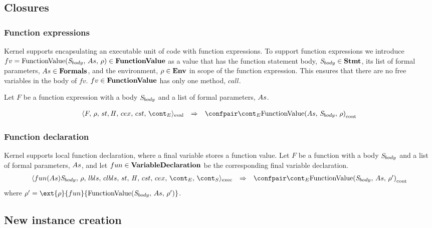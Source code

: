 \documentclass{article}
\begin{document}
\subsection{Closures}
\subsubsection{Function expressions}

Kernel supports encapsulating an executable unit of code with function expressions. To support function expressions we introduce $fv = \mathrm{FunctionValue}({\mathit{S}_{body}},\,{As},\,{\rho}) \in \mathbf{FunctionValue}$ as a value that has the function statement body, $\mathit{S}_{body} \in \mathbf{Stmt}$, its list of formal parameters, $As \in \mathbf{Formals}$, and the environment, $\rho \in \mathbf{Env}$ in scope of the function expression. This ensures that there are no free variables in the body of $fv$. $fv \in \mathbf{FunctionValue}$ has only one method, $call$.

Let $F$ be a function expression with a body $\mathit{S}_{body}$ and a list of formal parameters, $As$.

\[
  \begin{array}{lcl}
	\evalconf{F}{\env}{st}{cex}{cst}{\econt}
	& \Rightarrow &
	\contconf{\econt}{\funval{\formals}{\stmt_{body}}{\env}}
  \end{array}
\]
\subsubsection{Function declaration}
Kernel supports local function declaration, where a final variable stores a function value. 
Let $F$ be a function with a body $\mathit{S}_{body}$ and a list of formal parameters, $As$, and let $fun \in \mathbf{VariableDeclaration}$ be the corresponding final variable declaration.
\[
  \begin{array}{lcl}
	\execconf{fun(\formals) \stmt_{body}}{\env}{\lbls}{\clbls}{\handler}{\cstrace}{\cex}{\econt}{\scont}
	& \Rightarrow &
	\contconf{\econt}{\funval{\stmt_{body}}{\formals}{\env'}}
  \end{array}
\]
where $\env' = \ext{\env}{fun}{\funval{\stmt_{body}}{\formals}{\env'}}$.

\subsection{New instance creation}
\end{document}
